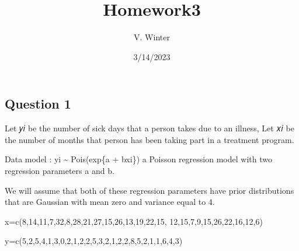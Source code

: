\documentclass[
]{article}
\title{Homework3}
\author{V. Winter}
\date{3/14/2023}
\newenvironment{Shaded}{\begin{snugshade}}{\end{snugshade}}
\newcommand{\DecValTok}[1]{\textcolor[rgb]{0.00,0.00,0.81}{#1}}
\newcommand{\FunctionTok}[1]{\textcolor[rgb]{0.00,0.00,0.00}{#1}}
\newcommand{\NormalTok}[1]{#1}
\newcommand{\OtherTok}[1]{\textcolor[rgb]{0.56,0.35,0.01}{#1}}
\begin{document}
\maketitle

\hypertarget{question-1}{%
\subsection{Question 1}\label{question-1}}

Let 𝑦𝑖 be the number of sick days that a person takes due to an illness,
Let 𝑥𝑖 be the number of months that person has been taking part in a
treatment program.

Data model : yi \textasciitilde{} Pois(exp\{a + bxi\}) a Poisson
regression model with two regression parameters a and b.

We will assume that both of these regression parameters have prior
distributions that are Gaussian with mean zero and variance equal to 4.

\begin{Shaded}
\begin{Highlighting}[]
\NormalTok{x}\OtherTok{=}\FunctionTok{c}\NormalTok{(}\DecValTok{8}\NormalTok{,}\DecValTok{14}\NormalTok{,}\DecValTok{11}\NormalTok{,}\DecValTok{7}\NormalTok{,}\DecValTok{32}\NormalTok{,}\DecValTok{8}\NormalTok{,}\DecValTok{28}\NormalTok{,}\DecValTok{21}\NormalTok{,}\DecValTok{27}\NormalTok{,}\DecValTok{15}\NormalTok{,}\DecValTok{26}\NormalTok{,}\DecValTok{13}\NormalTok{,}\DecValTok{19}\NormalTok{,}\DecValTok{22}\NormalTok{,}\DecValTok{15}\NormalTok{,}
    \DecValTok{12}\NormalTok{,}\DecValTok{15}\NormalTok{,}\DecValTok{7}\NormalTok{,}\DecValTok{9}\NormalTok{,}\DecValTok{15}\NormalTok{,}\DecValTok{26}\NormalTok{,}\DecValTok{22}\NormalTok{,}\DecValTok{16}\NormalTok{,}\DecValTok{12}\NormalTok{,}\DecValTok{6}\NormalTok{)}

\NormalTok{y}\OtherTok{=}\FunctionTok{c}\NormalTok{(}\DecValTok{5}\NormalTok{,}\DecValTok{2}\NormalTok{,}\DecValTok{5}\NormalTok{,}\DecValTok{4}\NormalTok{,}\DecValTok{1}\NormalTok{,}\DecValTok{3}\NormalTok{,}\DecValTok{0}\NormalTok{,}\DecValTok{2}\NormalTok{,}\DecValTok{1}\NormalTok{,}\DecValTok{2}\NormalTok{,}\DecValTok{2}\NormalTok{,}\DecValTok{5}\NormalTok{,}\DecValTok{3}\NormalTok{,}\DecValTok{2}\NormalTok{,}\DecValTok{1}\NormalTok{,}\DecValTok{2}\NormalTok{,}\DecValTok{2}\NormalTok{,}\DecValTok{8}\NormalTok{,}\DecValTok{5}\NormalTok{,}\DecValTok{2}\NormalTok{,}\DecValTok{1}\NormalTok{,}\DecValTok{1}\NormalTok{,}\DecValTok{6}\NormalTok{,}\DecValTok{4}\NormalTok{,}\DecValTok{3}\NormalTok{)}
\end{Highlighting}
\end{Shaded}
\end{document}
